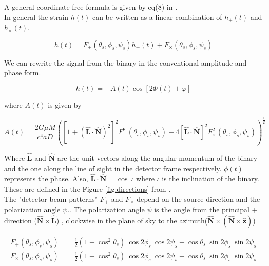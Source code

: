 \documentclass[10pt,a4paper]{article}
\begin{document}
A general coordinate free formula is given by eq(8) in \cite{cornish}.\\
 
In general the strain $h(t)$ can be written as a linear combination of $h_{+}(t)$ and $h_{\times}(t)$.

\begin{equation}
h(t) = F_{+}(\theta_s,\phi_s,\psi_s) h_{+}(t) + F_{\times}(\theta_s,\phi_s,\psi_s)
\end{equation}

We can rewrite the signal from the binary in the conventional amplitude-and-phase form.

\begin{equation}
h(t) = -A(t) \cos[2\Phi(t) +\varphi]
\end{equation}

where $A(t)$ is given by



\begin{equation}
A(t) = \frac{2 G \mu M}{c^4 a D}\left([1+(\hat{\textbf{L}} \cdot \hat{\textbf{N}})^2]^2 F_{+}^2(\theta_s,\phi_s,\psi_s) + 4[\hat{\textbf{L}} \cdot \hat{\textbf{N}}]^2 F_{\times}^2(\theta_s,\phi_s,\psi_s) \right)^{\frac{1}{2}}
\end{equation}

Where $\hat{\textbf{L}}$ and $\hat{\textbf{N}}$ are the unit vectors along the angular momentum of the binary and the one along the line of sight in the detector frame respectively. $\phi(t)$ represents the phase. 
Also, $\hat{\textbf{L}} \cdot \hat{\textbf{N}} = \cos \ \iota$ where $\iota$ is the inclination of the binary. These are defined in the Figure \ref{fig:directions} from \citep{ACST}.\\ 

The "detector beam patterns" $F_{+}$ and $F_{\times}$ depend on the source direction and the  polarization angle $\psi$.\citep{cutler}. The polarization angle $\psi$ is the angle from the principal + direction ($\hat{\textbf{N}} \times \hat{\textbf{L}}$) , clockwise in the plane of sky to the azimuth($\hat{\textbf{N}} \times (\hat{\textbf{N}} \times \hat{\textbf{z}})$)

\begin{align}
F_{+}(\theta_s,\phi_s,\psi_s)&=\frac{1}{2}(1+ \cos^2\theta_s) \ \cos2\phi_s \ \cos2\psi_s - \cos\theta_s \ \sin 2\phi_s \ \sin 2\psi_s\\
F_{\times}(\theta_s,\phi_s,\psi_s)&=\frac{1}{2}(1+ \cos^2\theta_s) \ \cos2\phi_s \ \cos2\psi_s + \cos\theta_s \ \sin 2\phi_s \ \sin 2\psi_s
\end{align}
\end{document}
